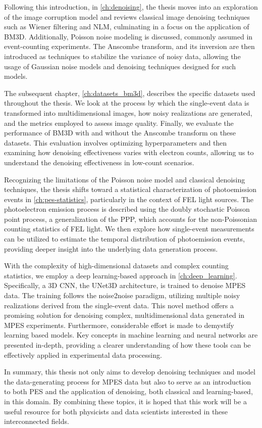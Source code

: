 Following this introduction, in \cref{ch:denoising}, the thesis moves into an exploration of the image corruption model and reviews  classical image denoising techniques such as Wiener filtering and \gls{NLM}, culminating in a focus on the application of \gls{BM3D}. Additionally, Poisson noise modeling is discussed, commonly assumed in event-counting experiments. The Anscombe transform, and its inversion are then introduced as techniques to stabilize the variance of noisy data, allowing the usage of Gaussian noise models and denoising techniques designed for such models.

The subsequent chapter, \cref{ch:datasets_bm3d}, describes the specific datasets used throughout the thesis. We look at the  process by which the single-event data is transformed into multidimensional images, how noisy realizations are generated, and the metrics employed to assess image quality. Finally, we evaluate the performance of \gls{BM3D} with and without the Anscombe transform on these datasets. This evaluation involves optimizing hyperparameters and then examining how denoising effectiveness varies with electron counts, allowing us to understand the denoising effectiveness in low-count scenarios.

Recognizing the limitations of the Poisson noise model and classical denoising techniques, the thesis shifts toward a statistical characterization of photoemission events in \cref{ch:pes-statistics}, particularly in the context of \gls{FEL} light sources. The photoelectron emission process is described using the doubly stochastic Poisson point process, a generalization of the \gls{PPP}, which accounts for the non-Poissonian counting statistics of \gls{FEL} light. We then explore how single-event measurements can be utilized to estimate the temporal distribution of photoemission events, providing deeper insight into the underlying data generation process.

With the complexity of high-dimensional datasets and complex counting statistics, we employ a deep learning-based approach in \cref{ch:deep_learning}. Specifically, a 3D \gls{CNN}, the UNet3D architecture, is trained to denoise \gls{MPES} data. The training follows the \gls{noise2noise} paradigm, utilizing multiple noisy realizations derived from the single-event data. This novel method offers a promising solution for denoising complex, multidimensional data generated in \gls{MPES} experiments. Furthermore, considerable effort is made to demystify learning based models. Key concepts in machine learning and neural networks are presented in-depth, providing a clearer understanding of how these tools can be effectively applied in experimental data processing.

In summary, this thesis not only aims to develop denoising techniques and model the data-generating process for \gls{MPES} data but also to serve as an introduction to both \gls{PES} and the application of denoising, both classical and learning-based, in this domain. By combining these topics, it is hoped that this work will be a useful resource for both physicists and data scientists interested in these interconnected fields.